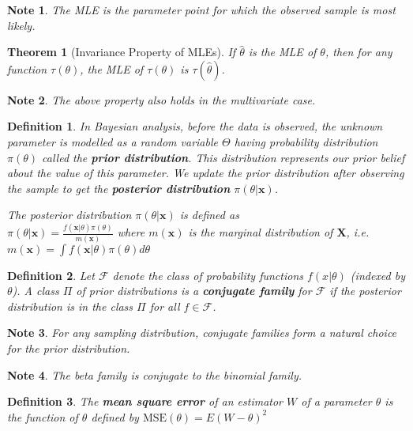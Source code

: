 \documentclass[14pt,twoside]{extreport}
\theoremstyle{dotless}
\newtheorem*{defn}{\footnotesize Definition}
\newtheorem*{thm}{\footnotesize Theorem} %
\newtheorem*{note}{\footnotesize Note} %
\begin{document}
\begin{note}
    The MLE is the parameter point for which the observed sample is most likely.
\end{note}

\begin{thm}[Invariance Property of MLEs]
    If $\hat{\theta}$ is the MLE of $\theta$, then for any function $\tau(\theta)$, the MLE of $\tau(\theta)$ is $\tau(\hat{\theta})$.
\end{thm}

\begin{note}
    The above property also holds in the multivariate case.
\end{note}

\begin{defn}
    In Bayesian analysis, before the data is observed, the unknown parameter is modelled as a random variable $\Theta$ having probability distribution $\pi(\theta)$ called the \textbf{prior distribution}. This distribution represents our prior belief about the value of this parameter. We update the prior distribution after observing the sample to get the \textbf{posterior distribution} $\pi(\theta|\bm{x})$.

    The posterior distribution $\pi(\theta|\bm{x})$ is defined as 
    \\ $\pi(\theta|\bm{x}) = \frac{f(\bm{x}|\theta) \pi(\theta) }{m(\bm{x})}$ where $m(\bm{x})$ is the marginal distribution of $\bm{X}$, i.e. $m(\bm{x}) = \int f(\bm{x} | \theta) \pi(\theta) d\theta$
\end{defn}

\begin{defn}
    Let $\mathcal{F}$ denote the class of probability functions $f(x|\theta)$ (indexed by $\theta$). A class $\Pi$ of prior distributions is a \textbf{conjugate family} for $\mathcal{F}$ if the posterior distribution is in the class $\Pi$ for all $f \in \mathcal{F}$.
\end{defn}

\begin{note}
    For any sampling distribution, conjugate families form a natural choice for the prior distribution.
\end{note}

\begin{note}
    The beta family is conjugate to the binomial family.
\end{note}

\begin{defn}
    The \textbf{mean square error} of an estimator $W$ of a parameter $\theta$ is the function of $\theta$ defined by $\text{MSE}(\theta) = E(W - \theta)^2$
\end{defn}
\end{document}
